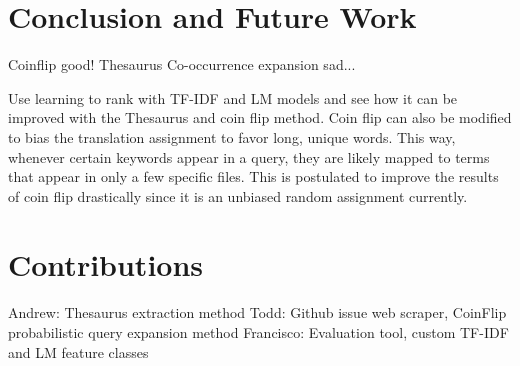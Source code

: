\documentclass[10pt,a4paper]{article}
\begin{document}
\section{Conclusion and Future Work}

Coinflip good! Thesaurus Co-occurrence expansion sad...

Use learning to rank with TF-IDF and LM models and see how it can be improved with the Thesaurus and coin flip method. Coin flip can also be modified to bias the translation assignment to favor long, unique words. This way, whenever certain keywords appear in a query, they are likely mapped to terms that appear in only a few specific files. This is postulated to improve the results of coin flip drastically since it is an unbiased random assignment currently.

\section{Contributions}

Andrew: Thesaurus extraction method
Todd: Github issue web scraper, CoinFlip probabilistic query expansion method
Francisco: Evaluation tool, custom TF-IDF and LM feature classes
\end{document}
